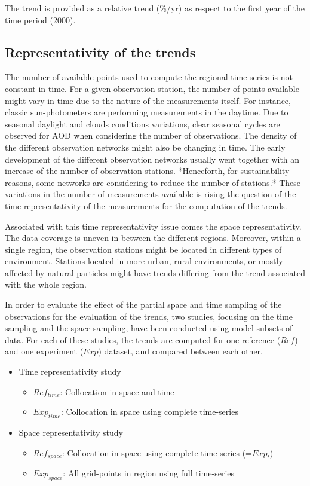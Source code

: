 \documentclass[journal abbreviation, manuscript]{copernicus}
\begin{document}
The trend is provided as a relative trend (\%/yr) as respect to the first year of the time period (2000).

\subsection{Representativity of the trends}
The number of available points used to compute the regional time series is not constant in time. For a given observation station, the number of points available might vary in time due to the nature of the measurements itself. For instance, classic sun-photometers are performing measurements in the daytime. Due to seasonal daylight and clouds conditions variations, clear seasonal cycles are observed for AOD when considering the number of observations. The density of the different observation networks might also be changing in time. The early development of the different observation networks usually went together with an increase of the number of observation stations. *Henceforth, for sustainability reasons, some networks are considering to reduce the number of stations.* These variations in the number of measurements available is rising the question of the time representativity of the measurements for the computation of the trends.

Associated with this time representativity issue comes the space representativity. The data coverage is uneven in between the different regions. Moreover, within a single region, the observation stations might be located in different types of environment. Stations located in more urban, rural environments, or mostly affected by natural particles might have trends differing from the trend associated with the whole region.

In order to evaluate the effect of the partial space and time sampling of the observations for the evaluation of the trends, two studies, focusing on the time sampling and the space sampling, have been conducted using model subsets of data. For each of these studies, the trends are computed for one reference ($Ref$) and one experiment ($Exp$) dataset, and compared between each other.
\begin{itemize}
 \item Time representativity study
       \begin{itemize}
        \item $Ref_{time}$: Collocation in space and time
        \item $Exp_{time}$: Collocation in space using complete time-series
       \end{itemize}
 \item Space representativity study
       \begin{itemize}
        \item $Ref_{space}$: Collocation in space using complete time-series (=$Exp_{t}$)
        \item $Exp_{space}$: All grid-points in region using full time-series
       \end{itemize}
\end{itemize}
\end{document}
